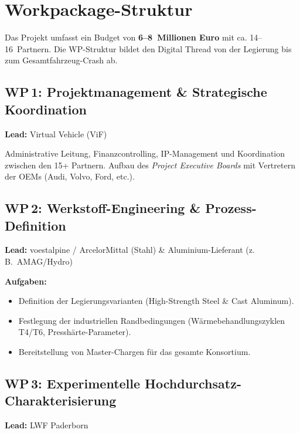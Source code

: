 \documentclass[12pt,a4paper]{article}
\begin{document}
\section{Workpackage-Struktur}

Das Projekt umfasst ein Budget von \textbf{6--8~Millionen Euro} mit ca.
14--16~Partnern. Die WP-Struktur bildet den Digital Thread von der Legierung
bis zum Gesamtfahrzeug-Crash ab.

\subsection{WP\,1: Projektmanagement \& Strategische Koordination}
\textbf{Lead:} Virtual Vehicle (ViF)

Administrative Leitung, Finanzcontrolling, IP-Management und Koordination
zwischen den 15+ Partnern. Aufbau des \emph{Project Executive Boards} mit
Vertretern der OEMs (Audi, Volvo, Ford, etc.).

\subsection{WP\,2: Werkstoff-Engineering \& Prozess-Definition}
\textbf{Lead:} voestalpine / ArcelorMittal (Stahl) \& Aluminium-Lieferant
(z.\,B.\ AMAG/Hydro)

\textbf{Aufgaben:}
\begin{itemize}[leftmargin=*]
  \item Definition der Legierungsvarianten (High-Strength Steel \& Cast
        Aluminum).
  \item Festlegung der industriellen Randbedingungen (Wärmebehandlungszyklen
        T4/T6, Presshärte-Parameter).
  \item Bereitstellung von Master-Chargen für das gesamte Konsortium.
\end{itemize}

\subsection{WP\,3: Experimentelle Hochdurchsatz-Charakterisierung}
\textbf{Lead:} LWF Paderborn
\end{document}

